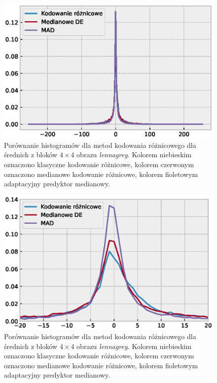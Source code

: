 \documentclass{article}
\begin{document}
\begin{figure}[H]
  \centering
  \includegraphics[width=.9\linewidth]{images/differential_encoding_histograms_comparison.eps}  
    \caption{Porównanie histogramów dla metod kodowania różnicowego dla średnich z bloków $4\times4$ obrazu \emph{lennagrey}. Kolorem niebieskim oznaczono klasyczne kodowanie różnicowe, kolorem czerwonym oznaczono medianowe kodowanie różnicowe, kolorem fioletowym adaptacyjny predyktor medianowy.}
  \label{fig:de_histograms_comparison}
\end{figure}

\begin{figure}[H]
  \centering
  \includegraphics[width=.9\linewidth]{images/differential_encoding_histograms_comparison_zoom.eps}  
  \caption{Porównanie histogramów dla metod kodowania różnicowego dla średnich z bloków $4\times4$ obrazu \emph{lennagrey}. Kolorem niebieskim oznaczono klasyczne kodowanie różnicowe, kolorem czerwonym oznaczono medianowe kodowanie różnicowe, kolorem fioletowym adaptacyjny predyktor medianowy.}
  \label{fig:de_histograms_comparison_zoom}
\end{figure}
\end{document}
